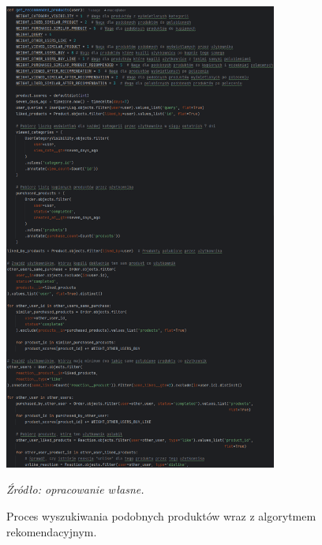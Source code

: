 \documentclass[12pt,a4paper,oneside]{article}
\theoremstyle{definition}
\numberwithin{equation}{section}
\begin{document}
\begin{figure}[H]
    \centering
    \includegraphics[width=0.8\textwidth]{images/krzysztofBImages/recommended_algorithm_1.png}
    \caption{Proces wyszukiwania podobnych produktów wraz z algorytmem rekomendacyjnym.}
    \emph{Źródło: opracowanie własne.}
    \label{fig:recommendation_step1}
\end{figure}
\end{document}
